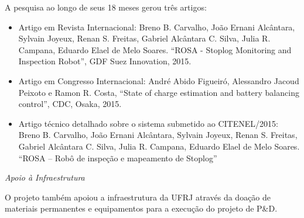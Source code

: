 A pesquisa ao longo de seus 18 meses gerou três artigos:
\begin{itemize}
\item Artigo em Revista Internacional: Breno B. Carvalho, João Ernani Alcântara,
Sylvain Joyeux, Renan S. Freitas, Gabriel Alcântara C. Silva, Julia R. Campana,
Eduardo Elael de Melo Soares. ``ROSA - Stoplog Monitoring and Inspection
Robot'', GDF Suez Innovation, 2015.
\item Artigo em Congresso Internacional: André Abido Figueiró, Alessandro Jacoud
Peixoto e Ramon R. Costa, ``State of charge estimation and battery balancing control'', CDC, Osaka, 2015.
\item Artigo técnico detalhado sobre o sistema submetido ao CITENEL/2015: Breno
B. Carvalho, João Ernani Alcântara, Sylvain Joyeux, Renan S. Freitas, Gabriel
Alcântara C. Silva, Julia R. Campana, Eduardo Elael de Melo Soares. ``ROSA – Robô
de inspeção e mapeamento de Stoplog'' 
\end{itemize}

\emph{Apoio à Infraestrutura}

O projeto também apoiou a infraestrutura da UFRJ através da doação de materiais
permanentes e equipamentos para a execução do projeto de P\&D.
